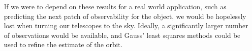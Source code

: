 \documentclass[11pt,twoside,letterpaper]{article}
\begin{document}
  If we were to depend on these results for a real world application,
  such as predicting the next patch of observability for the object,
  we would be hopelessly lost when turning our telescopes to the
  sky. Ideally, a significantly larger number of observations would be
  available, and Gauss' least squares methods could be used to refine
  the estimate of the orbit.   
  
  {}
  
\end{document}
